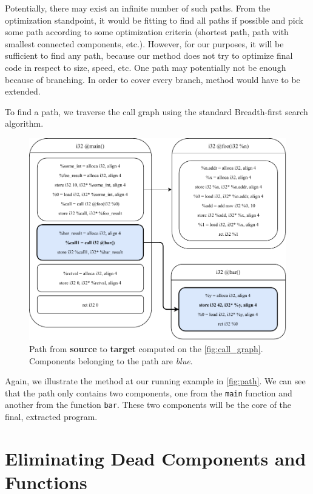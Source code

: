 \documentclass[12pt, twoside]{fithesis2}
\renewcommand{\_}{\leavevmode \kern0.07em\vbox{\hrule width0.4em}}
\begin{document}
Potentially, there may exist an infinite number of such paths.
From the optimization standpoint, it would be fitting to find all paths if
possible and pick some path according to some optimization criteria (shortest
path, path with smallest connected components, etc.).
However, for our purposes, it will be sufficient to find any path, because
our method does not try to optimize final code in respect to size, speed, etc.
One path may potentially not be enough because of branching. In order to cover
every branch, method would have to be extended.

To find a path, we traverse the call graph using the standard Breadth-first
search algorithm.

\begin{figure}[ht]
    \centering
    \includegraphics[]{images/main_path.pdf}
    \caption{Path from \textbf{source} to \textbf{target} computed on the
    \autoref{fig:call_graph}. Components belonging to the path are \emph{blue}.
    }
    \label{fig:path}
\end{figure}

Again, we illustrate the method at our running example in \autoref{fig:path}.
We can see that the path only contains two components, one from the
\texttt{main} function and another from the function
\texttt{bar}.
These two components will be the core of the final, extracted program.

\section{Eliminating Dead Components and Functions}
\label{sec:design-removing}
\end{document}
